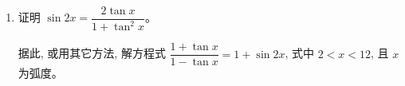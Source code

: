\documentclass{report}
\newcommand{\sol}{\vspace{0.2cm}\textbf{解}:}
\begin{document}
\begin{enumerate}[leftmargin=*]
        \begin{enumerate}
            \item $y$ 的极大值与极小值;
            \sol{}
            
            $y$ is maximum when $\cos(x + 60^{\circ}) = 1$, hence the maximum value is $2$.

            $y$ is minimum when $\cos(x + 60^{\circ}) = -1$, hence the minimum value is $-2$. \hfill $\blacksquare$
            
            \item 当 $y=1$ 时， $x$ 的一般解。
            
            \sol{}
            \begin{align*}
                2\cos(x + 60^{\circ}) &= 1\\
                \cos(x + 60^{\circ}) &= \dfrac{1}{2}\\
                x + 60^{\circ} &= 360^{\circ}k \pm 60^{\circ}\\
                x &= 360^{\circ}k - 60^{\circ} \pm 60^{\circ}\\
                x &= 360^{\circ}k \text{ or } x = 360^{\circ}k - 120^{\circ} \quad \text{where } k \in \mathbb{Z} & \blacksquare
            \end{align*}
        \end{enumerate}

        \item 证明 $\sin 2 x=\dfrac{2 \tan x}{1+\tan ^2 x}$。

        据此, 或用其它方法, 解方程式 $\dfrac{1+\tan x}{1-\tan x}=1+\sin 2 x$, 式中 $2<x<12$, 且 $x$ 为弧度。



\end{enumerate}
\end{document}
